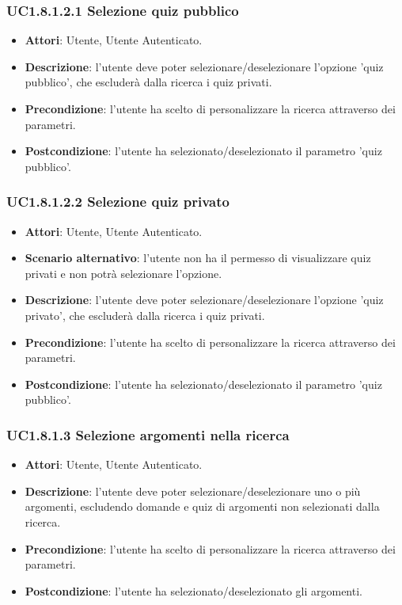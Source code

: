 \subsubsection{UC1.8.1.2.1 Selezione quiz pubblico}
\begin{itemize}
\item \textbf{Attori}: Utente, Utente Autenticato.
\item \textbf{Descrizione}: l'utente deve poter selezionare/deselezionare l'opzione 'quiz pubblico', che escluderà dalla ricerca i quiz privati.
\item \textbf{Precondizione}: l'utente ha scelto di personalizzare la ricerca attraverso dei parametri.
\item \textbf{Postcondizione}: l'utente ha selezionato/deselezionato il parametro 'quiz pubblico'.
\end{itemize}
\subsubsection{UC1.8.1.2.2 Selezione quiz privato}
\begin{itemize}
\item \textbf{Attori}: Utente, Utente Autenticato.
\item \textbf{Scenario alternativo}: l'utente non ha il permesso di visualizzare quiz privati e non potrà selezionare l'opzione.
\item \textbf{Descrizione}: l'utente deve poter selezionare/deselezionare l'opzione 'quiz privato', che escluderà dalla ricerca i quiz privati.
\item \textbf{Precondizione}: l'utente ha scelto di personalizzare la ricerca attraverso dei parametri.
\item \textbf{Postcondizione}: l'utente ha selezionato/deselezionato il parametro 'quiz pubblico'.
\end{itemize}
\subsubsection{UC1.8.1.3 Selezione argomenti nella ricerca}
\begin{itemize}
\item \textbf{Attori}: Utente, Utente Autenticato.
\item \textbf{Descrizione}: l'utente deve poter selezionare/deselezionare uno o più argomenti, escludendo domande e quiz di argomenti non selezionati dalla ricerca.
\item \textbf{Precondizione}: l'utente ha scelto di personalizzare la ricerca attraverso dei parametri.
\item \textbf{Postcondizione}: l'utente ha selezionato/deselezionato gli argomenti.
\end{itemize}
